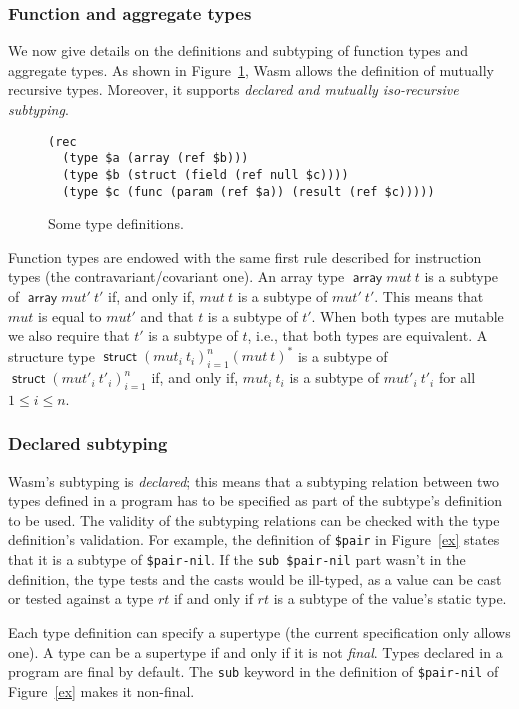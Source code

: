\documentclass[a4paper,11pt]{article}
\DeclareMathOperator{\strt}{\textsf{struct}}
\DeclareMathOperator{\arrt}{\textsf{array}}
\begin{document}
\subsubsection{Function and aggregate types}\label{func-aggr}
We now give details on the definitions and subtyping of function types and
aggregate types. As shown in Figure~\ref{tdef}, Wasm allows the definition of
mutually recursive types. Moreover, it supports \emph{declared and mutually
iso-recursive subtyping}.

\begin{figure}[h]
  \begin{lstlisting}
(rec
  (type $a (array (ref $b)))
  (type $b (struct (field (ref null $c))))
  (type $c (func (param (ref $a)) (result (ref $c)))))
  \end{lstlisting}
  \caption{Some type definitions.}\label{tdef}
\end{figure}

Function types are endowed with the same first rule described for instruction
types (the contravariant/covariant one). An array type $\arrt mut\ t$ is a
subtype of $\arrt mut'\ t'$ if, and only if, $mut\ t$ is a subtype of
$mut'\ t'$. This means that $mut$ is equal to $mut'$ and that $t$ is a subtype
of $t'$. When both types are mutable we also require that $t'$ is a subtype of
$t$, i.e., that both types are equivalent. A structure type $\strt
{(mut_i\ t_i)}_{i=1}^n {(mut\ t)}^*$ is a subtype of $\strt
{(mut'_i\ t'_i)}_{i=1}^n$ if, and only if, $mut_i\ t_i$ is a subtype of
$mut'_i\ t'_i$ for all $1\leq i\leq n$.

\subsubsection{Declared subtyping}
Wasm's subtyping is \emph{declared}; this means that a subtyping relation
between two types defined in a program has to be specified as part of the
subtype's definition to be used. The validity of the subtyping relations can be
checked with the type definition's validation. For example, the definition of
\texttt{\$pair} in Figure~\ref{ex} states that it is a subtype of
\texttt{\$pair-nil}. If the \texttt{sub \$pair-nil} part wasn't in the
definition, the type tests and the casts would be ill-typed, as a value can be
cast or tested against a type $rt$ if and only if $rt$ is a subtype of the
value's static type.

Each type definition can specify a supertype (the current specification only
allows one). A type can be a supertype if and only if it is not \emph{final}.
Types declared in a program are final by default. The \texttt{sub} keyword in
the definition of \texttt{\$pair-nil} of Figure~\ref{ex} makes it non-final.
\end{document}
